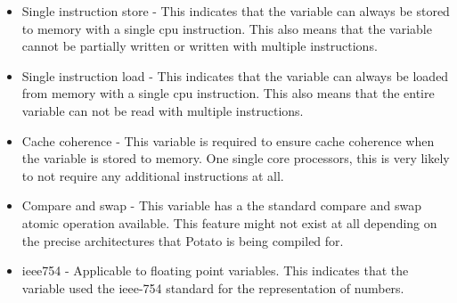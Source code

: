 \documentclass[12pt]{article}
\newcommand{\progLangNameSpace}{Potato }
\begin{document}
\begin{itemize}
\item Single instruction store - This indicates that the variable can always be stored to memory with a single cpu instruction. This also means that the variable cannot be partially written or written with multiple instructions.
\item Single instruction load - This indicates that the variable can always be loaded from memory with a single cpu instruction. This also means that the entire variable can not be read with multiple instructions.
\item Cache coherence - This variable is required to ensure cache coherence when the variable is stored to memory. One single core processors, this is very likely to not require any additional instructions at all.
\item Compare and swap - This variable has a the standard compare and swap atomic operation available. This feature might not exist at all depending on the precise architectures that \progLangNameSpace is being compiled for.
\item ieee754 - Applicable to floating point variables. This indicates that the variable used the ieee-754 standard for the representation of numbers.

\end{itemize}
\end{document}
